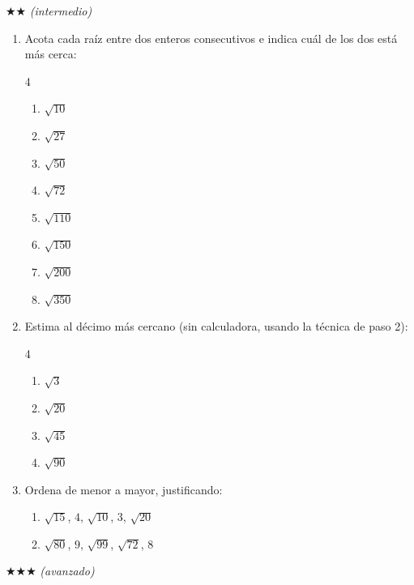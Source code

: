 \documentclass[11pt, letterpaper]{article}
\begin{document}
$\bigstar\bigstar$ \textit{(intermedio)}

\begin{enumerate}[label=\textbf{\arabic*.}, leftmargin=*, resume]
  \item Acota cada raíz entre dos enteros consecutivos e indica cuál de los dos está más cerca:
  \begin{multicols}{4}
  \begin{enumerate}[label=\alph*)]
    \item $\sqrt{10}$
    \item $\sqrt{27}$
    \item $\sqrt{50}$
    \item $\sqrt{72}$
    \item $\sqrt{110}$
    \item $\sqrt{150}$
    \item $\sqrt{200}$
    \item $\sqrt{350}$
  \end{enumerate}
  \end{multicols}

  \item Estima al décimo más cercano (sin calculadora, usando la técnica de paso 2):
  \begin{multicols}{4}
  \begin{enumerate}[label=\alph*)]
    \item $\sqrt{3}$
    \item $\sqrt{20}$
    \item $\sqrt{45}$
    \item $\sqrt{90}$
  \end{enumerate}
  \end{multicols}

  \item Ordena de menor a mayor, justificando:
  \begin{enumerate}[label=\alph*)]
    \item $\sqrt{15}$, $4$, $\sqrt{10}$, $3$, $\sqrt{20}$
    \item $\sqrt{80}$, $9$, $\sqrt{99}$, $\sqrt{72}$, $8$
  \end{enumerate}
\end{enumerate}

$\bigstar\bigstar\bigstar$ \textit{(avanzado)}
\end{document}
